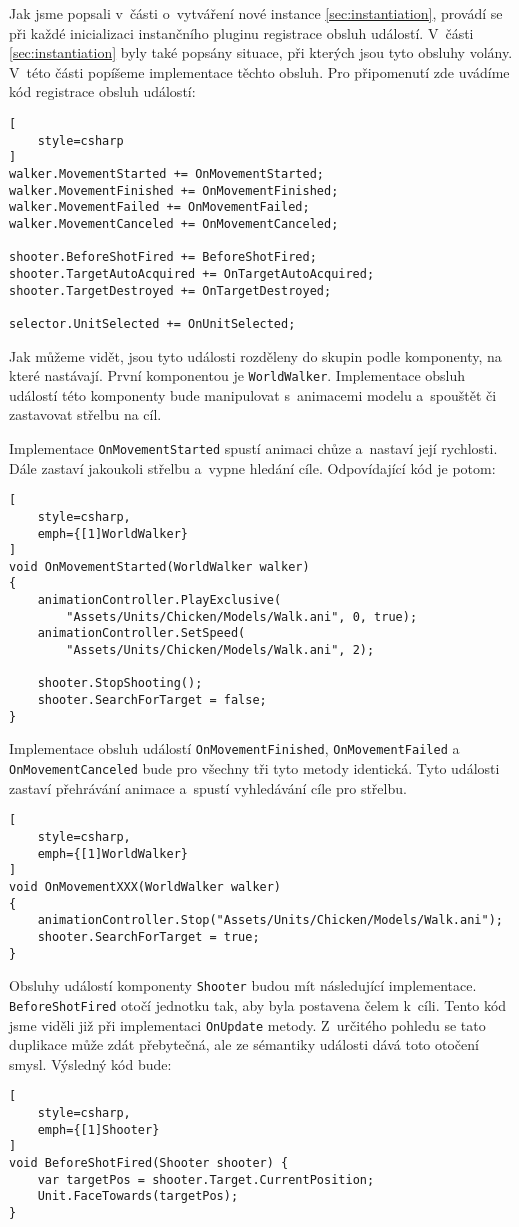 Jak jsme popsali v~části o~vytváření nové instance \ref{sec:instantiation}, provádí se při každé inicializaci instančního pluginu registrace obsluh událostí. V~části \ref{sec:instantiation} byly také popsány situace, při kterých jsou tyto obsluhy volány. V~této části popíšeme implementace těchto obsluh. Pro připomenutí zde uvádíme kód registrace obsluh událostí:
\begin{lstlisting}[
	style=csharp
]
walker.MovementStarted += OnMovementStarted;
walker.MovementFinished += OnMovementFinished;
walker.MovementFailed += OnMovementFailed;
walker.MovementCanceled += OnMovementCanceled;

shooter.BeforeShotFired += BeforeShotFired;
shooter.TargetAutoAcquired += OnTargetAutoAcquired;
shooter.TargetDestroyed += OnTargetDestroyed;

selector.UnitSelected += OnUnitSelected;
\end{lstlisting}

Jak můžeme vidět, jsou tyto události rozděleny do skupin podle komponenty, na které nastávají. První komponentou je \texttt{WorldWalker}. Implementace obsluh událostí této komponenty bude manipulovat s~animacemi modelu a~spouštět či zastavovat střelbu na cíl.

Implementace \texttt{OnMovementStarted} spustí animaci chůze a~nastaví její rychlosti. Dále zastaví jakoukoli střelbu a~vypne hledání cíle. Odpovídající kód je potom:
\begin{lstlisting}[
	style=csharp,
	emph={[1]WorldWalker}
]
void OnMovementStarted(WorldWalker walker)
{
	animationController.PlayExclusive(
		"Assets/Units/Chicken/Models/Walk.ani", 0, true);
	animationController.SetSpeed(
		"Assets/Units/Chicken/Models/Walk.ani", 2);

	shooter.StopShooting();
	shooter.SearchForTarget = false;
}
\end{lstlisting}

Implementace obsluh událostí \texttt{OnMovementFinished}, \texttt{OnMovementFailed} a \texttt{OnMovementCanceled} bude pro všechny tři tyto metody identická. Tyto události zastaví přehrávání animace a~spustí vyhledávání cíle pro střelbu.
\begin{lstlisting}[
	style=csharp,
	emph={[1]WorldWalker}
]
void OnMovementXXX(WorldWalker walker)
{
	animationController.Stop("Assets/Units/Chicken/Models/Walk.ani");
	shooter.SearchForTarget = true;
}
\end{lstlisting}

Obsluhy událostí komponenty \texttt{Shooter} budou mít následující implementace. \texttt{BeforeShotFired} otočí jednotku tak, aby byla postavena čelem k~cíli. Tento kód jsme viděli již při implementaci \texttt{OnUpdate} metody. Z~určitého pohledu se tato duplikace může zdát přebytečná, ale ze sémantiky události dává toto otočení smysl. Výsledný kód bude:
\begin{lstlisting}[
	style=csharp,
	emph={[1]Shooter}
]
void BeforeShotFired(Shooter shooter) {
	var targetPos = shooter.Target.CurrentPosition;
	Unit.FaceTowards(targetPos);
}
\end{lstlisting}

